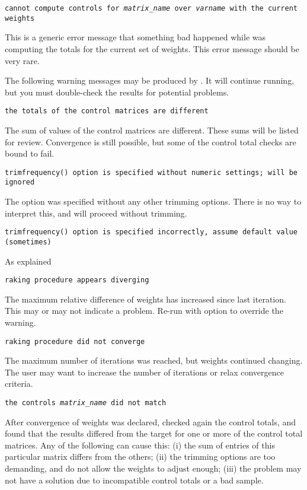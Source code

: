     \noindent
    {\tt cannot compute controls for {\it matrix{\_}name} over
    {\it varname} with the current weights}

    \morehang
    This is a generic error message that something bad happened while
     was computing the totals for the current set of weights.
    This error message should be very rare.

The following warning messages may be produced by
. It will continue running, but you must
double-check the results for potential problems.

\noindent
    {\tt the totals of the control matrices are different}

    \morehang
    The sum of values of the control matrices are different.
    These sums will be listed for review. Convergence is still
    possible, but some of the control total checks are bound to fail.

    \noindent
    {\tt trimfrequency() option is specified without numeric settings; will be ignored}

    \morehang
    The option  was specified without any other trimming options.
    There is no way to interpret this, and  will proceed without
    trimming.

    \noindent
    {\tt trimfrequency() option is specified incorrectly, assume default value (sometimes)}

    \morehang
    As explained

    \noindent
    {\tt raking procedure appears diverging}

    \morehang
    The maximum relative difference of weights has increased since last
    iteration. This may or may not indicate a problem. Re-run 
    with  option to override the warning.

    \noindent
    {\tt raking procedure did not converge}

    \morehang
    The maximum number of iterations was reached, but weights continued
    changing. The user may want to increase the number of iterations
    or relax convergence criteria.

    \noindent
    {\tt the controls {\it matrix{\_}name} did not match}

    \morehang
    After convergence of weights was declared, 
    checked again the control totals, and found that the results 
    differed from the target for one or more of the control total
    matrices. Any of the following can cause this: (i) the sum of 
    entries of this particular matrix differs from the others;
    (ii) the trimming options are too demanding, and do not allow
    the weights to adjust enough; (iii) the problem may not have a
    solution due to incompatible control totals or a bad sample.

